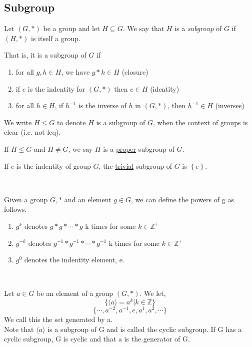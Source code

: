 \subsection{Subgroup}
\begin{definition}
    Let $(G, *)$ be a group and let $H \subseteq G$. We say that $H$ is a \emph{subgroup} of $G$ if $(H, *)$ is itself a group.

    That is, it is a subgroup of $G$ if
    \begin{enumerate}
        \item for all $g,h\in H$, we have $g*h\in H$ (closure)
        \item if $e$ is the indentity for $(G, *)$ then $e\in H$ (identity)
        \item for all $h\in H$, if $h^{-1}$ is the inverse of $h$ in $(G, *)$, then $h^{-1}\in H$ (inverses)
    \end{enumerate}

    We write $H \leq G$ to denote $H$ is a subgroup of $G$, when the context of groups is clear (i.e. not leq).

    If $H\leq G$ and $H \neq G$, we say $H$ is a \underline{proper} subgroup of $G$.

    If $e$ is the indentity of group $G$, the \underline{trivial} subgroup of $G$ is $\left\{e\right\}$.
\end{definition}\\
\begin{definition}
    Given a group \(G, *\) and an element \(g \in G\), we can define the powers of g as follows.\\
    \begin{enumerate}
        \item \(g^k\) denotes \(g*g*\cdots*g\) k times for some \(k\in \mathbb Z^+\)
        \item \(g^{-k}\) denotes \(g^{-1}*g^{-1}*\cdots*g^{-1}\) k times for some \(k\in \mathbb Z^+\)
        \item \(g^0\) denotes the indentity element, e.
    \end{enumerate}
\end{definition}\\
\begin{definition}
    Let \(a\in  G\) be an element of a group \((G, *)\). We let,
        \[\{\langle a \rangle = a^k | k\in \mathbb Z\}\]
        \[\{\cdots, a^{-2}, a^{-1}, e, a^1, a^2, \cdots\}\]
    We call this the set generated by a. \\
    Note that \(\langle a \rangle\) is a subgroup of G and is called the cyclic subgroup. If G has a cyclic subgroup, G is cyclic and that a is the generator of G.
\end{definition}\\
